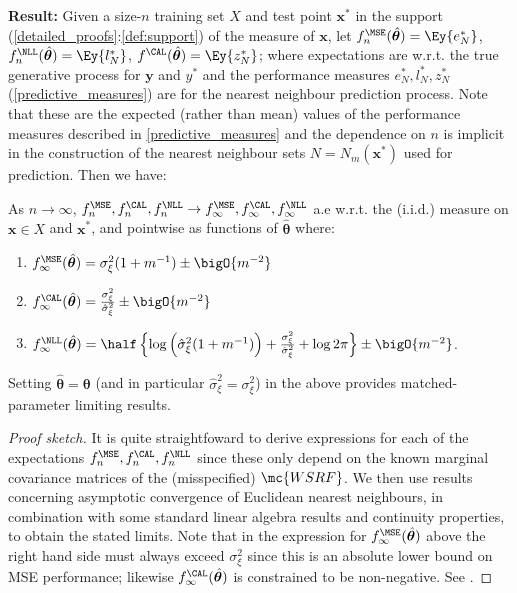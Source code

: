 \textbf{Result:} Given a size-$n$ training set $X$ and test point $\bm{x}^*$ in the support (\ref{detailed_proofs}:\autoref{def:support}) of the measure of $\bm{x}$, let $f^{\MSE}_n(\hat{\bm{\theta}})= \Ey {e_N^*}$, $f^{\NLL}_n(\hat{\bm{\theta}})= \Ey {l_N^*}$, $f^{\CAL}(\hat{\bm{\theta}}) = \Ey{z_N^*}$; where expectations are w.r.t. the true generative process for $\bm{y}$ and $y^*$ and the performance measures $e_N^*,l_N^*,z_N^*$ (\autoref{predictive_measures}) are for the nearest neighbour prediction process.
Note that these are the expected (rather than mean) values of the performance measures described in \autoref{predictive_measures} and the dependence on \(n\) is implicit in the construction of the nearest neighbour sets $N = N_m(\bm{x}^*)$ used for prediction. Then we have:

\begin{theorem}
  \label{thm:gpnn_limit} 
  As \(n\rightarrow\infty\), \(f_n^{\MSE},f_n^{\CAL},f_n^{\NLL} \rightarrow f_\infty^{\MSE},f_\infty^{\CAL},f_\infty^{\NLL}\) a.e w.r.t. the (i.i.d.) measure on $\mathbf{x} \in X$ and $\mathbf{x^*}$, and pointwise as functions of $\hat{\bm{\theta}}$ where:
  \begin{enumerate}[label=(\roman*)]
    \item  \( f_\infty^{\MSE}(\hat{\bm{\theta}}) = \sigma_\xi^2(1+m^{-1}) \pm \bigO{m^{-2}}\) \label{eq:mse_lim}
    \item  \( f_\infty^{\CAL}(\hat{\bm{\theta}}) = \frac{\sigma_\xi^2}{\hat{\sigma}_\xi^2} \pm \bigO{m^{-2}}\) \label{eq:cal_lim}
    \item \(  f_\infty^{\NLL}(\hat{\bm{\theta}}) =\half \left\{ \log\left(\hat{\sigma}_\xi^2(1 + m^{-1})\right) + \frac{\sigma_\xi^2}{\hat{\sigma}_\xi^2} +\log2\pi \right\} \pm \bigO{m^{-2}} \). \label{eq:nll_lim}
  \end{enumerate}
  Setting \(\hat{\bm{\theta}}=\bm{\theta}\) (and in particular \(\hat{\sigma}_\xi^2=\sigma_\xi^2\)) in the above provides matched-parameter limiting results.
\end{theorem}
\begin{proof}[Proof sketch]
It is quite straightfoward to derive expressions for each of the expectations \(f_n^{\MSE},f_n^{\CAL},f_n^{\NLL}\) since these only depend on the known marginal covariance matrices of the (misspecified) $\mc{WSRF}$. We then use results concerning asymptotic convergence of Euclidean nearest neighbours, in combination with some standard linear algebra results and continuity properties, to obtain the stated limits. Note that in the expression for \( f_\infty^{\MSE}(\hat{\bm{\theta}})\) above the right hand side must always exceed $\sigma_\xi^2$ since this is an absolute lower bound on MSE performance; likewise \( f_\infty^{\CAL}(\hat{\bm{\theta}})\) is constrained to be non-negative. See .
\end{proof}

